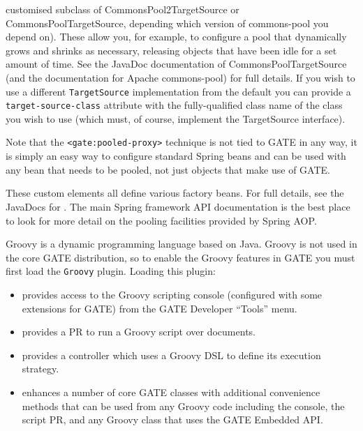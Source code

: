 customised subclass of CommonsPool2TargetSource or CommonsPoolTargetSource,
depending which version of commons-pool you depend on).  These allow you, for
example, to configure a pool that dynamically grows and shrinks as necessary,
releasing objects that have been idle for a set amount of time.  See the
%
{JavaDoc documentation of CommonsPoolTargetSource} (and the documentation for
Apache commons-pool) for full details.  If you wish to use a different
\verb|TargetSource| implementation from the default
you can provide a \verb|target-source-class| attribute with the fully-qualified
class name of the class you wish to use (which must, of course, implement the
TargetSource interface).

Note that the \verb|<gate:pooled-proxy>| technique is not tied to GATE in any
way, it is simply an easy way to configure standard Spring beans and can be
used with any bean that needs to be pooled, not just objects that make use of
GATE.


These custom elements all define various factory beans.  For full details, see
the JavaDocs for \texttt{}.
The main Spring framework API documentation is the best place to look for more
detail on the pooling facilities provided by Spring AOP.


Groovy is a dynamic programming language based on Java. Groovy is not used in
the core GATE distribution, so to enable the Groovy features in GATE you must
first load the \verb|Groovy| plugin.  Loading this plugin:
\begin{itemize}
\item provides access to the Groovy scripting console (configured with some
  extensions for GATE) from the GATE Developer ``Tools'' menu.
\item provides a PR to run a Groovy script over documents.
\item provides a controller which uses a Groovy DSL to define its execution
  strategy.
\item enhances a number of core GATE classes with additional convenience
  methods that can be used from any Groovy code including the console, the
  script PR, and any Groovy class that uses the GATE Embedded API.
\end{itemize}
    
